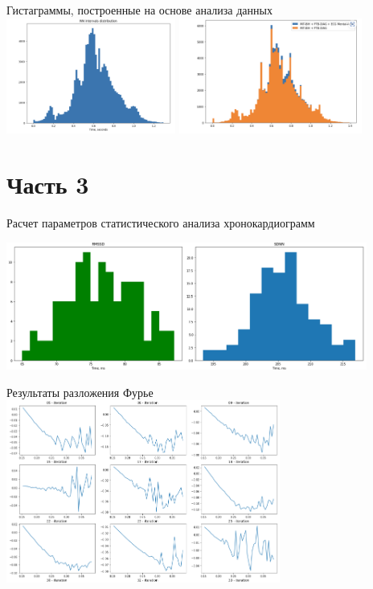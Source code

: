 \documentclass[xcolor=table]{beamer}
\begin{document}
\begin{frame}{Гистаграммы, построенные на основе анализа данных}
\includegraphics[height=3.8cm]{Распределение1.png}
\includegraphics[height=3.8cm]{Распределение2.png}
\end{frame}




\section{Часть 3}
\begin{frame}{Расчет параметров статистического анализа хронокардиограмм}

\centering
\includegraphics[height=4.2cm]{graph2.png}

\end{frame}


\begin{frame}{Результаты разложения Фурье}
\centering
\includegraphics[height=6cm]{images/image.png}
\end{frame}
\end{document}
